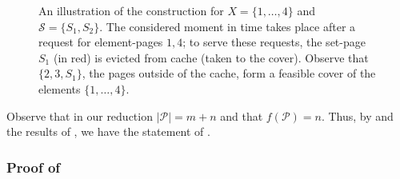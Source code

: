 \documentclass[11pt]{article}
\newcommand{\cP}{{\mathcal{P}}}
\newcommand{\cS}{{\mathcal{S}}}
\begin{document}
{\begin{figure}
		\caption{\label{fig:Y} An illustration of the construction for $X = \{1,\ldots,4\}$ and $\cS = \{S_1,S_2\}$. The considered moment in time takes place after a request for element-pages $1,4$; to serve these requests, the set-page $S_1$ (in red) is evicted from cache (taken to the cover). Observe that $\{2,3,S_1\}$, the pages outside of the cache, form a feasible cover of the elements $\{1,\ldots,4\}$.}
	\end{figure}
 
Observe that in our reduction $|\cP| = m+n$ and that $f(\cP) = n$. Thus, by  and the results of \cite{alon2003online,korman2004use}, we have the statement of . %




\subsubsection*{Proof of }

}
\end{document}
